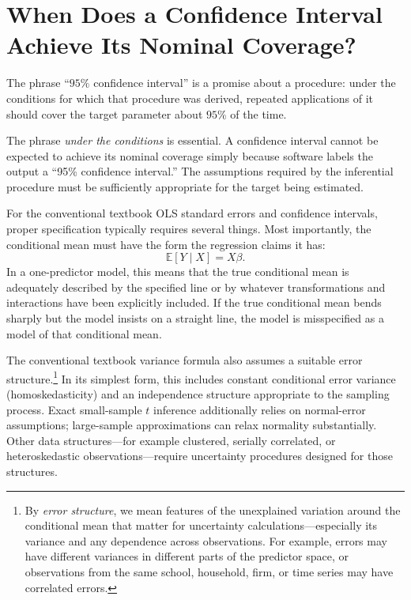 \documentclass[11pt]{report}
\newcommand{\E}{\mathbb{E}}
\begin{document}
\section{When Does a Confidence Interval Achieve Its Nominal Coverage?}

The phrase ``\(95\%\) confidence interval'' is a promise about a procedure: under the conditions for which that procedure was derived, repeated applications of it should cover the target parameter about \(95\%\) of the time.

The phrase \emph{under the conditions} is essential. A confidence interval cannot be expected to achieve its nominal coverage simply because software labels the output a ``95\% confidence interval.'' The assumptions required by the inferential procedure must be sufficiently appropriate for the target being estimated.

For the conventional textbook OLS standard errors and confidence intervals, proper specification typically requires several things. Most importantly, the conditional mean must have the form the regression claims it has:
\[
\E[Y\mid X]
=
X\beta.
\]
In a one-predictor model, this means that the true conditional mean is adequately described by the specified line or by whatever transformations and interactions have been explicitly included. If the true conditional mean bends sharply but the model insists on a straight line, the model is misspecified as a model of that conditional mean.

The conventional textbook variance formula also assumes a suitable error structure.\footnote{By \emph{error structure}, we mean features of the unexplained variation around the conditional mean that matter for uncertainty calculations---especially its variance and any dependence across observations. For example, errors may have different variances in different parts of the predictor space, or observations from the same school, household, firm, or time series may have correlated errors.} In its simplest form, this includes constant conditional error variance (homoskedasticity) and an independence structure appropriate to the sampling process. Exact small-sample \(t\) inference additionally relies on normal-error assumptions; large-sample approximations can relax normality substantially. Other data structures---for example clustered, serially correlated, or heteroskedastic observations---require uncertainty procedures designed for those structures.
\end{document}
